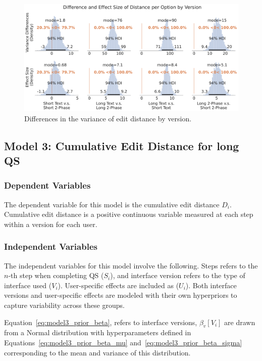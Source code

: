 \begin{figure}[h!]
    \centering
    \includegraphics[width=\textwidth]{content/image/distance/distance_diff_per_option_effect_size_by_version_all.pdf}
    \caption{Differences in the variance of edit distance by version.}
    \label{fig:bayesian_distance_variance}
\end{figure}

\newpage
\subsection{Model 3: Cumulative Edit Distance for long QS} \label{sec:apdx:model_cum_distance}

\subsubsection{Dependent Variables}
The dependent variable for this model is the cumulative edit distance \( D_i \). Cumulative edit distance is a positive continuous variable measured at each step within a version for each user.

\subsubsection{Independent Variables}
The independent variables for this model involve the following. Steps refers to the $n$-th step when completing QS ($S_i$), and interface version refers to the type of interface used ($V_i$). User-specific effects are included as ($U_i$). Both interface versions and user-specific effects are modeled with their own hyperpriors to capture variability across these groups. 

Equation~\ref{eq:model3_prior_beta}, refers to interface versions, $\beta_v[V_i]$ are drawn from a Normal distribution with hyperparameters defined in Equations~\ref{eq:model3_prior_beta_mu} and~\ref{eq:model3_prior_beta_sigma} corresponding to the mean and variance of this distribution. 

